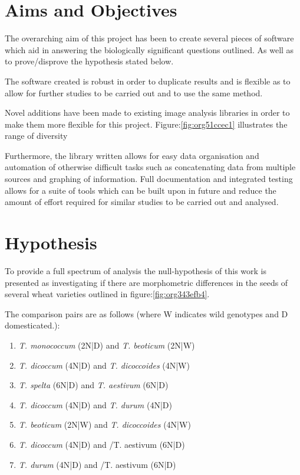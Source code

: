 \documentclass[11pt]{report}
\begin{document}
\section{Aims and Objectives}
\label{sec:org7749f2d}

The overarching aim of this project has been to create several pieces of software which aid in answering the biologically significant questions outlined. As well as to prove/disprove the hypothesis stated below.

The software created is robust in order to duplicate results and is flexible as to allow for further studies to be carried out and to use the same method.

Novel additions have been made to existing image analysis libraries in order to make them more flexible for this project. Figure:\ref{fig:org51ccec1} illustrates the range of diversity

Furthermore, the library written allows for easy data organisation and automation of otherwise difficult tasks such as concatenating data from multiple sources and graphing of information. Full documentation and integrated testing allows for a suite of tools which can be built upon in future and reduce the amount of effort required for similar studies to be carried out and analysed.

\section{Hypothesis}
\label{sec:org0a1397e}
To provide a full spectrum of analysis the null-hypothesis of this work is presented as investigating if there are morphometric differences in the seeds of several wheat varieties outlined in figure:\ref{fig:org343efb4}.

The comparison pairs are as follows (where W indicates wild genotypes and D domesticated.):

\begin{enumerate}
\item \emph{T. monococcum} (2N|D) and \emph{T. beoticum} (2N|W)
\item \emph{T. dicoccum} (4N|D) and \emph{T. dicoccoides} (4N|W)
\item \emph{T. spelta} (6N|D) and \emph{T. aestivum} (6N|D)
\item \emph{T. dicoccum} (4N|D) and \emph{T. durum} (4N|D)
\item \emph{T. beoticum} (2N|W) and \emph{T. dicoccoides} (4N|W)
\item \emph{T. dicoccum} (4N|D) and /T. aestivum (6N|D)
\item \emph{T. durum} (4N|D) and /T. aestivum (6N|D)
\end{enumerate}
\end{document}
